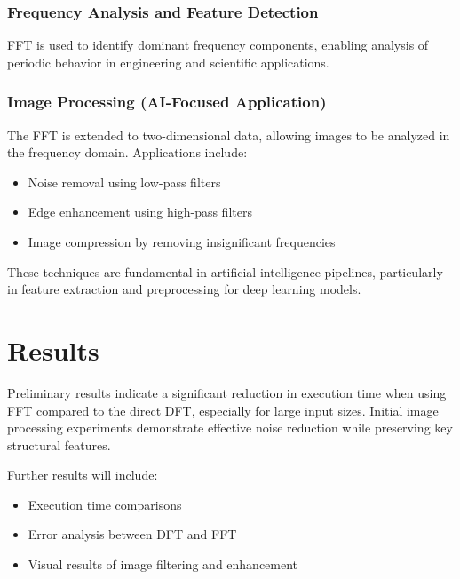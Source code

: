 \documentclass{zc-ust-hw}
\begin{document}
\subsubsection{Frequency Analysis and Feature Detection}
FFT is used to identify dominant frequency components, enabling analysis of periodic behavior in engineering and scientific applications.

\subsubsection{Image Processing (AI-Focused Application)}
The FFT is extended to two-dimensional data, allowing images to be analyzed in the frequency domain. Applications include:
\begin{itemize}
    \item Noise removal using low-pass filters
    \item Edge enhancement using high-pass filters
    \item Image compression by removing insignificant frequencies
\end{itemize}

These techniques are fundamental in artificial intelligence pipelines, particularly in feature extraction and preprocessing for deep learning models.

\section{Results}
Preliminary results indicate a significant reduction in execution time when using FFT compared to the direct DFT, especially for large input sizes. Initial image processing experiments demonstrate effective noise reduction while preserving key structural features.

Further results will include:
\begin{itemize}
    \item Execution time comparisons
    \item Error analysis between DFT and FFT
    \item Visual results of image filtering and enhancement
\end{itemize}
\end{document}

